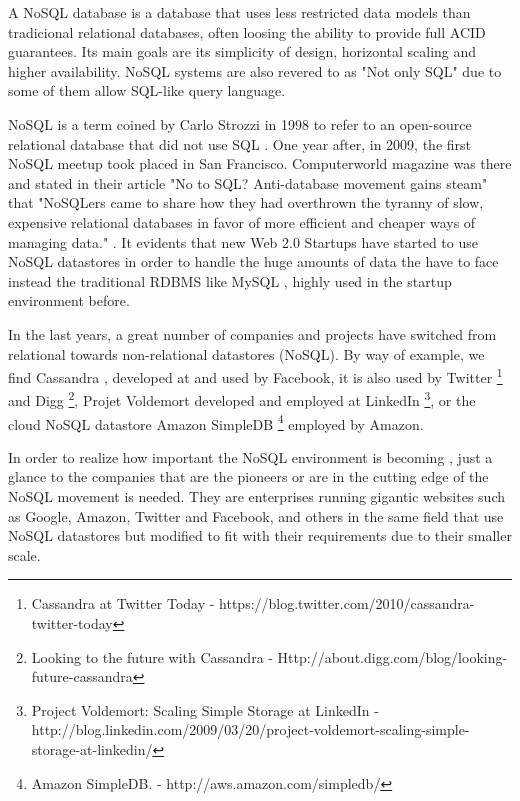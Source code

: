 \par
A NoSQL database is a database that uses less restricted data models than tradicional relational databases, often loosing the ability to provide full ACID guarantees. Its main goals are its simplicity of design, horizontal scaling and higher availability. NoSQL systems are also revered to as "Not only SQL" due to some of them allow SQL-like query language.
\par
NoSQL is a term coined by Carlo Strozzi in 1998 to refer to an open-source relational database that did not use SQL \cite{Strozzi}. One year after, in 2009, the first NoSQL meetup took placed in San Francisco. Computerworld magazine was there and stated in their article "No to SQL? Anti-database movement gains steam" that "NoSQLers came to share how they had overthrown the tyranny of slow, expensive relational databases in favor of more efficient and cheaper ways of managing data." \cite{ComputerworldNoSQL}. It evidents that new Web 2.0 Startups have started to use NoSQL datastores in order to handle the huge amounts of data the have to face instead the traditional RDBMS like MySQL \nocite{MySQL}, highly used in the startup environment before.
\par
In the last years, a great number of companies and projects have switched from relational towards non-relational datastores (NoSQL). By way of example, we find Cassandra \cite{ApacheCassandra}, developed at and used by Facebook, it is also used by Twitter \footnote{Cassandra at Twitter Today - https://blog.twitter.com/2010/cassandra-twitter-today} and Digg \footnote{Looking to the future with Cassandra - Http://about.digg.com/blog/looking-future-cassandra}, Projet Voldemort developed and employed at LinkedIn \footnote{Project Voldemort: Scaling Simple Storage at LinkedIn - http://blog.linkedin.com/2009/03/20/project-voldemort-scaling-simple-storage-at-linkedin/}, or the cloud NoSQL datastore Amazon SimpleDB \footnote{Amazon SimpleDB. -
http://aws.amazon.com/simpledb/} employed by Amazon.
\par
In order to realize how important the NoSQL environment is becoming , just a glance to the companies that are the pioneers or are in the cutting edge of the NoSQL movement is needed. They are enterprises running gigantic websites such as Google, Amazon, Twitter and Facebook, and others in the same field that use NoSQL datastores but modified to fit with their requirements due to their smaller scale.
\par



